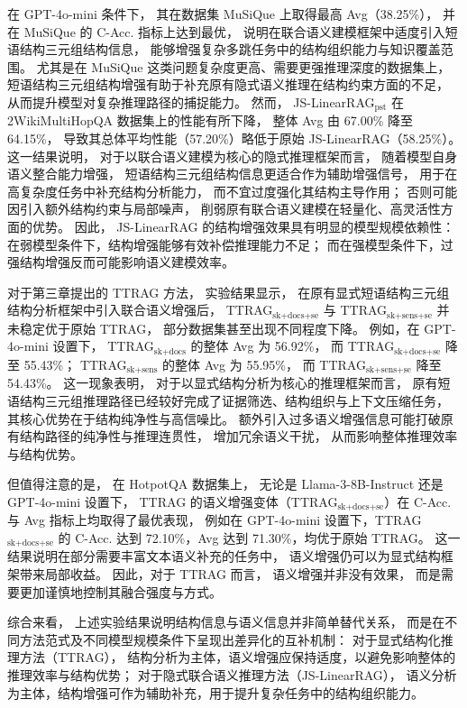 在 GPT-4o-mini 条件下，
其在数据集 MuSiQue 上取得最高 Avg（38.25\%），
并在 MuSiQue 的 C-Acc. 指标上达到最优，
说明在联合语义建模框架中适度引入短语结构三元组结构信息，
能够增强复杂多跳任务中的结构组织能力与知识覆盖范围。
尤其是在 MuSiQue 这类问题复杂度更高、需要更强推理深度的数据集上，
短语结构三元组结构增强有助于补充原有隐式语义推理在结构约束方面的不足，
从而提升模型对复杂推理路径的捕捉能力。
然而，
JS-LinearRAG$_{\text{pst}}$ 在 2WikiMultiHopQA 数据集上的性能有所下降，
整体 Avg 由 67.00\% 降至 64.15\%，
导致其总体平均性能（57.20\%）略低于原始 JS-LinearRAG（58.25\%）。
这一结果说明，
对于以联合语义建模为核心的隐式推理框架而言，
随着模型自身语义整合能力增强，
短语结构三元组结构信息更适合作为辅助增强信号，
用于在高复杂度任务中补充结构分析能力，
而不宜过度强化其结构主导作用；
否则可能因引入额外结构约束与局部噪声，
削弱原有联合语义建模在轻量化、高灵活性方面的优势。
因此，
JS-LinearRAG 的结构增强效果具有明显的模型规模依赖性：
在弱模型条件下，结构增强能够有效补偿推理能力不足；
而在强模型条件下，过强结构增强反而可能影响语义建模效率。

对于第三章提出的 TTRAG 方法，
实验结果显示，
在原有显式短语结构三元组结构分析框架中引入联合语义增强后，
TTRAG$_{\text{sk+docs+se}}$ 与 TTRAG$_{\text{sk+sens+se}}$
并未稳定优于原始 TTRAG，
部分数据集甚至出现不同程度下降。
例如，在 GPT-4o-mini 设置下，
TTRAG$_{\text{sk+docs}}$ 的整体 Avg 为 56.92\%，
而 TTRAG$_{\text{sk+docs+se}}$ 降至 55.43\%；
TTRAG$_{\text{sk+sens}}$ 的整体 Avg 为 55.95\%，
而 TTRAG$_{\text{sk+sens+se}}$ 降至 54.43\%。
这一现象表明，
对于以显式结构分析为核心的推理框架而言，
原有短语结构三元组推理路径已经较好完成了证据筛选、结构组织与上下文压缩任务，
其核心优势在于结构纯净性与高信噪比。
额外引入过多语义增强信息可能打破原有结构路径的纯净性与推理连贯性，
增加冗余语义干扰，
从而影响整体推理效率与结构优势。

但值得注意的是，
在 HotpotQA 数据集上，
无论是 Llama-3-8B-Instruct 还是 GPT-4o-mini 设置下，
TTRAG 的语义增强变体（TTRAG$_{\text{sk+docs+se}}$）在 C-Acc. 与 Avg 指标上均取得了最优表现，
例如在 GPT-4o-mini 设置下，TTRAG$_{\text{sk+docs+se}}$ 的 C-Acc. 达到 72.10\%，Avg 达到 71.30\%，均优于原始 TTRAG。
这一结果说明在部分需要丰富文本语义补充的任务中，
语义增强仍可以为显式结构框架带来局部收益。
因此，对于 TTRAG 而言，
语义增强并非没有效果，
而是需要更加谨慎地控制其融合强度与方式。

综合来看，
上述实验结果说明结构信息与语义信息并非简单替代关系，
而是在不同方法范式及不同模型规模条件下呈现出差异化的互补机制：
对于显式结构化推理方法（TTRAG），
结构分析为主体，语义增强应保持适度，以避免影响整体的推理效率与结构优势；
对于隐式联合语义推理方法（JS-LinearRAG），
语义分析为主体，结构增强可作为辅助补充，用于提升复杂任务中的结构组织能力。

